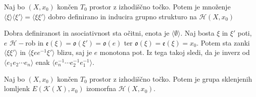 \documentclass[mat1]{fmfdelo}
\DeclareRobustCommand{\h}{
    \mathcal{H}}
\begin{document}
\begin{izrek}
Naj bo $(X,x_0)$ končen $T_0$ prostor z izhodiščno točko. Potem je množenje $\langle\xi\rangle\langle\xi'\rangle=\langle\xi\xi'\rangle$ dobro definirano in inducira grupno strukturo na $\mathscr{H}(X,x_0)$
\end{izrek}

\begin{dokaz}
Dobra definiranost in asociativnost sta očitni, enota je $\langle\emptyset\rangle$. Naj bosta $\xi$ in $\xi'$ poti, $e$ $\h-$rob in $\mathfrak{e}(\xi)=\mathfrak{o}(\xi')=\mathfrak{o}(e)$ ter $\mathfrak{o}(\xi)=\mathfrak{e}(\xi)=x_0$. Potem sta zanki $\langle\xi \xi'\rangle$ in $\langle\xi e e^{-1} \xi'\rangle$ blizu, saj je $e$ monotona pot. Iz tega takoj sledi, da je inverz od $\langle e_1 e_2 \cdots e_n\rangle$ enak $\langle e_n^{-1} \cdots e_2^{-1}e_1^{-1}\rangle$.
\end{dokaz}


\begin{izrek}
Naj bo $(X,x_0)$ končen $T_0$ prostor z izhodiščno točko. Potem je grupa sklenjenih lomljenk $E(\mathcal{K}(X),x_0)$ izomorfna $\mathscr{H}(X,x_0)$.
\end{izrek}
\end{document}
